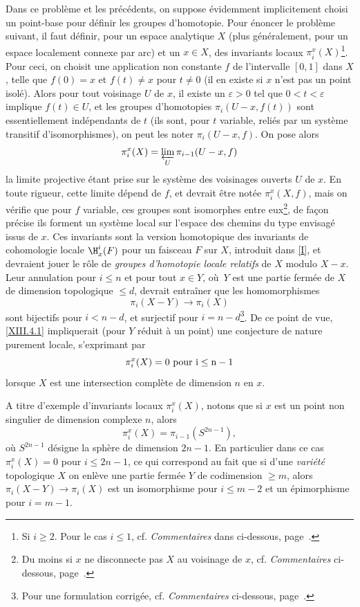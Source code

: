 \enlargethispage{\baselineskip}%
Dans ce probl\`eme et les pr\'ec\'edents, on suppose \'evidemment implicitement choisi un point-base pour d\'efinir les groupes d'homotopie. Pour \'enoncer le probl\`eme suivant, il faut d\'efinir, pour un espace analytique $X$ (plus g\'en\'eralement, pour un espace localement connexe par arc) et un $x\in X$, des invariants locaux $\pi_i^x(X)$\footnote{Si $i\ge 2$. Pour le cas $i\le 1$, cf. \emph{Commentaires} dans  ci-dessous, page~\pageref{p25y}.}.\label{pagexpo} Pour ceci, on choisit une application non constante $f$ de l'intervalle $[0, 1]$ dans $X$, telle que $f(0)=x$ et $f(t)\neq x$ pour $t\neq 0$ (il en existe si $x$ n'est pas un point isol\'e). Alors pour tout voisinage $U$ de $x$, il existe un $\varepsilon>0$ tel que $0<t<\varepsilon$ implique $f(t)\in U$, et les groupes d'homotopies $\pi_i(U-x, f(t))$ sont essentiellement ind\'ependants de $t$ (ils sont, pour $t$ variable, reli\'es par un syst\`eme transitif d'isomorphismes), on peut les noter $\pi_i(U-x, f)$. On pose alors\label{pip15}\label{pXIII.15}
$$
\pi_i^x(X)= \varprojlim_{U}\pi_{i-1}(U-x, f)
$$
la limite projective \'etant prise sur le syst\`eme des voisinages ouverts $U$ de $x$. En toute rigueur, cette limite d\'epend de $f$, et devrait \^etre not\'ee $\pi_i^x(X, f)$, mais on v\'erifie que pour $f$ variable, ces groupes sont isomorphes entre eux\footnote{Du moins si $x$ ne disconnecte pas $X$ au voisinage de $x$, cf. \emph{Commentaires} ci-dessous, page~\pageref{p25y}.}, de fa\c con pr\'ecise ils forment un syst\`eme local sur l'espace des chemins du type envisag\'e issus de $x$. Ces invariants sont la version homotopique des invariants de cohomologie locale $\H^i_x(F)$ pour un faisceau $F$ sur $X$, introduit dans \ref{I}, et devraient jouer le r\^{o}le de \emph{groupes d'homotopie locale relatifs} de $X$ modulo $X-x$. Leur annulation pour $i\le n$ et pour tout $x\in Y$, o\`u~$Y$ est une partie ferm\'ee de $X$ de dimension topologique $\le d$, devrait entra\^iner que les homomorphismes
$$
\pi_i(X-Y) \to \pi_i(X)
$$
sont bijectifs pour $i<n-d$, et surjectif pour $i=n-d$\footnote{Pour une formulation corrig\'ee, cf. \emph{Commentaires} ci-dessous, page~\pageref{p25y}.}. De ce point de vue, \ref{XIII.4.1} impliquerait (pour $Y$ r\'eduit \`a un point) une conjecture de nature purement locale, s'exprimant par 
$$
\pi_i^x(X)=0 \rm{\ pour\ } i\le n-1\label{p15l}
$$
lorsque $X$ est une intersection compl\`ete de dimension $n$ en $x$.

A titre d'exemple d'invariants locaux $\pi_i^x(X)$, notons que si $x$ est un point non singulier de \ignorespaces dimension complexe $n$, alors
$$
\pi_i^x(X)=\pi_{i-1}(S^{2n-1}),
$$
o\`u $S^{2n-1}$ d\'esigne la sph\`ere de dimension $2n-1$. En particulier dans ce cas $\pi_{i}^x(X)=0$ pour $i\le 2n-1$, ce qui correspond au fait que si d'une \emph{variété} topologique $X$ on enl\`eve une partie ferm\'ee $Y$ de codimension $\ge m$, alors $\pi_i(X-Y)\to \pi_i(X)$ est un isomorphisme pour $i\le m-2$ et un \'epimorphisme pour $i=m-1$.

